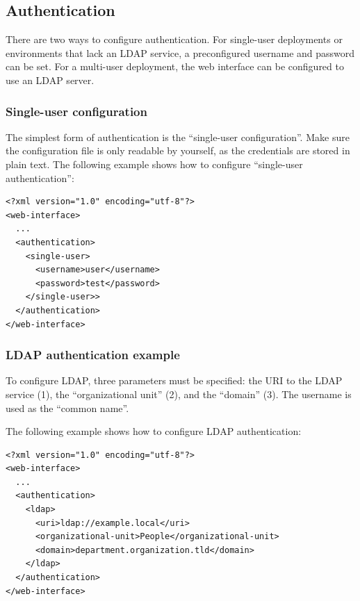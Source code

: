 \subsection{Authentication}
\label{sec:authentication}

  There are two ways to configure authentication.  For single-user deployments
  or environments that lack an LDAP service, a preconfigured username and
  password can be set.  For a multi-user deployment, the web interface can be
  configured to use an LDAP server.

\subsubsection{Single-user configuration}

  The simplest form of authentication is the ``single-user configuration''.
  Make sure the configuration file is only readable by yourself, as the
  credentials are stored in plain text.  The following example shows how
  to configure ``single-user authentication'':

\begin{siderules}
\begin{verbatim}
<?xml version="1.0" encoding="utf-8"?>
<web-interface>
  ...
  <authentication>
    <single-user>
      <username>user</username>
      <password>test</password>
    </single-user>>
  </authentication>
</web-interface>
\end{verbatim}
\end{siderules}

\subsubsection{LDAP authentication example}

  To configure LDAP, three parameters must be specified: the URI to the LDAP
  service (1), the ``organizational unit'' (2), and the ``domain'' (3).  The
  username is used as the ``common name''.

  The following example shows how to configure LDAP authentication:

\begin{siderules}
\begin{verbatim}
<?xml version="1.0" encoding="utf-8"?>
<web-interface>
  ...
  <authentication>
    <ldap>
      <uri>ldap://example.local</uri>
      <organizational-unit>People</organizational-unit>
      <domain>department.organization.tld</domain>
    </ldap>
  </authentication>
</web-interface>
\end{verbatim}
\end{siderules}

